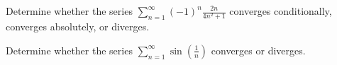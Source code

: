 \documentclass[12pt]{amsart}
\begin{document}
\newpage

\begin{thm}[15 Points]
    Determine whether the series
    \(\displaystyle{\sum_{n = 1}^\infty (-1)^n\frac{2n}{4n^2 + 1}}\)
    converges conditionally, converges absolutely, or diverges.
\end{thm}

\vspace{2in}

\begin{thm}
    Determine whether the series
    \(\displaystyle{\sum_{n = 1}^\infty \sin\left(\frac{1}{n}\right)}\)
  converges or diverges.
\end{thm}
\end{document}
